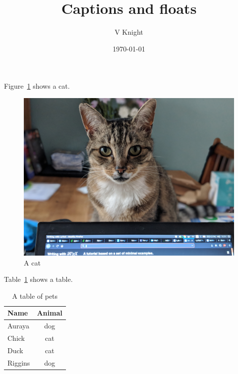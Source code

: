 \documentclass{article}
\title{Captions and floats}
\author{V Knight}
\date{\today}
\begin{document}
 

\maketitle

Figure~\ref{my_picture} shows a cat.

\begin{figure}[!htbp]
    \begin{center}
        \includegraphics[width=.6\textwidth]{cat.jpg}
    \end{center}
    \caption{A cat}
    \label{my_picture}
\end{figure}

Table~\ref{my_table} shows a table.


\begin{table}[!hbtp]
    \begin{center}
        \begin{tabular}{|l|c|}
            \hline
            Name & Animal \\
            \hline
            Auraya & dog \\
            \hline
            Chick & cat \\
            \hline
            Duck & cat \\
            \hline
            Riggins & dog \\
            \hline
        \end{tabular}
    \end{center}
    \caption{A table of pets}
    \label{my_table}
\end{table}
\end{document}

